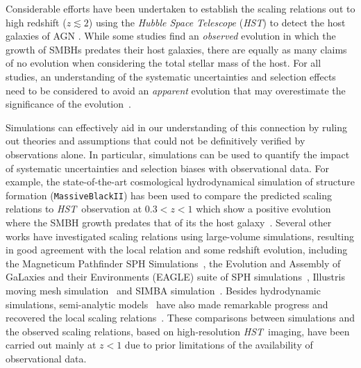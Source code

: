 \documentclass[twocolumn,trackchanges]{aastex63}
\newcommand{\hst}{{\it HST}}
\begin{document}
Considerable efforts have been undertaken to establish the scaling relations out to high redshift ($z \lesssim2$) using the {\it Hubble Space Telescope} (\hst) to detect the host galaxies of AGN \citep[e.g.,][]{Peng2006a, Tre++07, Woo++08,Jahnke2009,Bennert11,Schramm2013,Park15,Mechtley2016,Ding2019}. While some studies find an {\it observed} evolution in which the growth of SMBHs predates their host galaxies, there are equally as many claims of no evolution when considering the total stellar mass of the host. For all studies, an understanding of the systematic uncertainties and selection effects~\citep{Tre++07,Lauer2007,Schulze2014} need to be considered to avoid an {\it apparent} evolution that may overestimate the significance of the evolution~\citep{Volonteri2011}.


Simulations can effectively aid in our understanding of this connection by ruling out theories and assumptions that could not be definitively verified by observations alone. In particular, simulations can be used to quantify the impact of systematic uncertainties and selection biases with observational data. For example, the state-of-the-art cosmological hydrodynamical simulation of structure formation (\texttt{MassiveBlackII}) has been used to compare the predicted scaling relations to \hst\ observation at $0.3<z<1$ which show a positive evolution where the SMBH growth predates that of its the host galaxy~\citep{DeG++15}. Several other works have investigated scaling relations using large-volume simulations, resulting in good agreement with the local relation and some redshift evolution, including the Magneticum Pathfinder SPH Simulations~\citep{Steinborn2015}, the Evolution and Assembly of GaLaxies and their Environments (EAGLE) suite of SPH simulations~\citep{Schaye2015}, Illustris moving mesh simulation~\citep{Sijacki2015, Vogelsberger2014, Li2019} and SIMBA simulation~\citep{Thomas2019}. Besides hydrodynamic simulations, semi-analytic models~\citep[e.g.,][]{Menci2014, Menci2016} have also made remarkable progress and recovered the local scaling relations~\citep{Kormendy13}. These comparisons between simulations and the observed scaling relations, based on high-resolution \hst\ imaging, have been carried out mainly at $z<1$ due to prior limitations of the availability of observational data.
\end{document}
